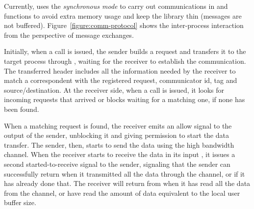 	Currently, \lwmpi uses the \textit{synchronous mode} to carry out
	communications in \mpisend and \mpirecv functions
	to avoid extra memory usage and keep the library thin (\ie messages
	are not buffered). Figure~\ref{figure:comm-protocol} shows the
	inter-process interaction from the perspective of message exchanges.

	Initially, when a \mpisend call is issued, the
	sender builds a request and transfers it to the target process
	through \mailbox, waiting for the receiver to establish the communication.
	The transferred header includes all the information needed by the receiver
	to match a correspondent \mpirecv with the registered request, \ie
	communicator id, tag and source/destination.
	At the receiver side, when a \mpirecv call is issued, it looks for
	incoming requests that arrived or blocks waiting for a matching
	one, if none has been found.

	When a matching request is found, the receiver emits an allow signal
	to the output \portal of the sender, unblocking it and giving permission
	to start the data transfer. The sender, then, starts to send the data
	using the high bandwidth channel. When the receiver starts to receive the
	data in its input \portal, it issues a second started-to-receive signal
	to the sender, signaling that the sender can successfully return when it
	transmitted all the data through the channel, or if it has already done that.
	The receiver will return from \mpirecv when it has
	read all the data from the channel, or have read the amount of data
	equivalent to the local user buffer size.
